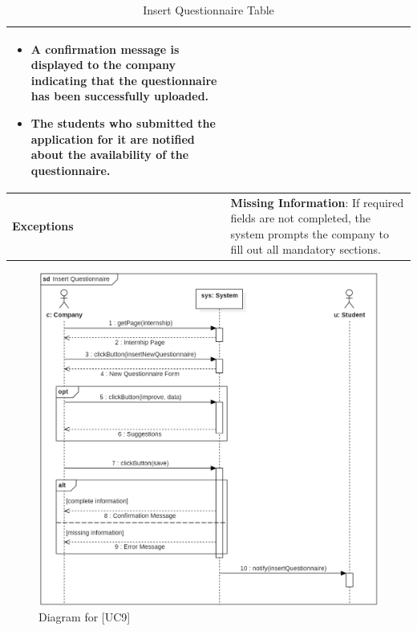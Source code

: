 \begin{table}[H]
\begin{tabular}{|p{4cm}|p{11cm}|}
    {\setlength{\leftmargini}{1.1em}
    \begin{itemize}
        \item A confirmation message is displayed to the company indicating that the questionnaire has been successfully uploaded.
        \item The students who submitted the application for it are notified about the availability of the questionnaire.
    \end{itemize}} \\ \hline
    \textbf{Exceptions} & 
    \textbf{Missing Information}: If required fields are not completed, the system prompts the company to fill out all mandatory sections. \\ \hline
    \end{tabular}
    \caption{Insert Questionnaire Table}
\end{table}

\begin{figure} [H]
    \centering
    \includegraphics[width=1\linewidth]{Use Cases Images/insert_questionnaire.png}
    \caption{Diagram for [UC9]}
    \label{fig: Insert Questionnaire Diagram}
\end{figure}


